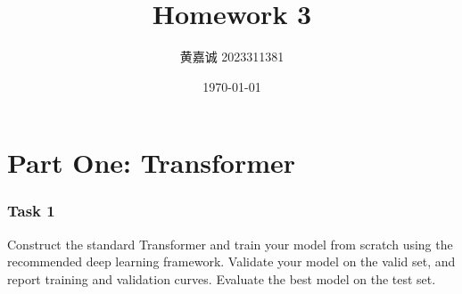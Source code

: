 \documentclass[
	12pt,
]{fphw}
\title{Homework 3} %
\author{黄嘉诚  2023311381} %
\date{\today} %
\institute{Tsinghua University } %
\begin{document}
\maketitle %


\part*{Part One: Transformer}

\section*{Task 1}

\begin{problem}
	\medskip
		\quad Construct the standard Transformer and train your model from scratch using the recommended deep learning framework. Validate your model on the valid set, and report training and validation curves. Evaluate the best model on the test set.
	\end{problem}

	
\end{document}
